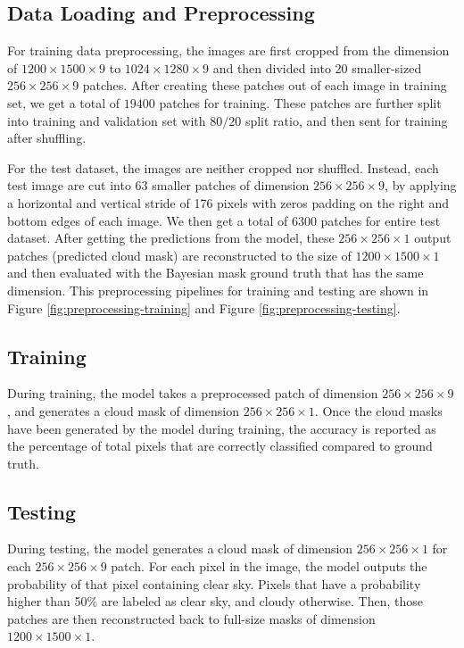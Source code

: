 \documentclass[sigplan,screen]{acmart}
\begin{document}
\subsection{Data Loading and Preprocessing} \label{Preprocessing}

For training data preprocessing, the images are first cropped from the dimension of $1200 \times 1500 \times 9$ to $1024 \times 1280 \times 9$ and then divided into 20 smaller-sized $256 \times 256 \times 9$ patches. After creating these patches out of each image in training set, we get a total of $19400$ patches for training. These patches are further split into training and validation set with $80/20$ split ratio, and then sent for training after shuffling. 

For the test dataset, the images are neither cropped nor shuffled. Instead, each test image are cut into 63 smaller patches of dimension $256 \times 256 \times 9$, by applying a horizontal and vertical stride of 176 pixels with zeros padding on the right and bottom edges of each image. We then get a total of $6300$ patches for entire test dataset. After getting the predictions from the model, these $256 \times 256 \times 1$ output patches (predicted cloud mask) are reconstructed to the size of $1200 \times 1500 \times 1$ and then evaluated with the Bayesian mask ground truth that has the same dimension. This preprocessing pipelines for training and testing are shown in Figure \ref{fig:preprocessing-training} and Figure \ref{fig:preprocessing-testing}.

\subsection{Training}

During training, the model takes a preprocessed patch of dimension $256 \times 256 \times 9$, and generates a cloud mask of dimension $256 \times 256 \times 1$. Once the cloud masks have been generated by the model during training, the accuracy is reported as the percentage of total pixels that are correctly classified compared to ground truth. 

\subsection{Testing}

During testing, the model generates a cloud mask of dimension $256 \times 256 \times 1$ for each $256 \times 256 \times 9$ patch. For each pixel in the image, the model outputs the probability of that pixel containing clear sky. Pixels that have a probability higher than 50\% are labeled as clear sky, and cloudy otherwise. Then, those patches are then reconstructed back to full-size masks of dimension $1200 \times 1500 \times 1$. 
\end{document}

